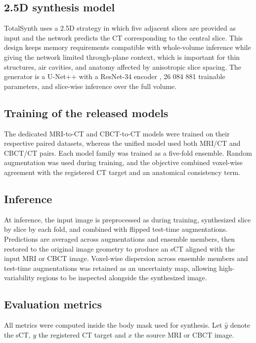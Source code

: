 \documentclass{article}
\begin{document}
\subsection{2.5D synthesis model}

TotalSynth uses a 2.5D strategy in which five adjacent slices are provided as input and the network predicts the CT corresponding to the central slice. This design keeps memory requirements compatible with whole-volume inference while giving the network limited through-plane context, which is important for thin structures, air cavities, and anatomy affected by anisotropic slice spacing. The generator is a U-Net++ with a ResNet-34 encoder \cite{zhou1807nested,he2016deep}, 26 084 881 trainable parameters, and slice-wise inference over the full volume.

\subsection{Training of the released models}

The dedicated MRI-to-CT and CBCT-to-CT models were trained on their respective paired datasets, whereas the unified model used both MRI/CT and CBCT/CT pairs. Each model family was trained as a five-fold ensemble. Random augmentation was used during training, and the objective combined voxel-wise agreement with the registered CT target and an anatomical consistency term.

\subsection{Inference}

At inference, the input image is preprocessed as during training, synthesized slice by slice by each fold, and combined with flipped test-time augmentations. Predictions are averaged across augmentations and ensemble members, then restored to the original image geometry to produce an sCT aligned with the input MRI or CBCT image. Voxel-wise dispersion across ensemble members and test-time augmentations was retained as an uncertainty map, allowing high-variability regions to be inspected alongside the synthesized image.

\subsection{Evaluation metrics}

All metrics were computed inside the body mask used for synthesis. Let $\hat{y}$ denote the sCT, $y$ the registered CT target and $x$ the source MRI or CBCT image.
\end{document}
